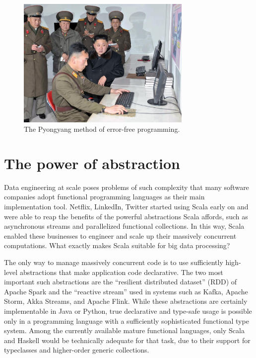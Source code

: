 \begin{figure}
\begin{centering}
\includegraphics[width=0.75\textwidth]{no-bugs}
\par\end{centering}
\caption{The Pyongyang method of error-free programming.}
\label{code-without-bugs}
\end{figure}


\section{The power of abstraction}

Data engineering at scale poses problems of such complexity that many
software companies adopt functional programming languages as their
main implementation tool. Netflix, LinkedIn, Twitter started using
Scala early on and were able to reap the benefits of the powerful
abstractions Scala affords, such as asynchronous streams and parallelized
functional collections. In this way, Scala enabled these businesses
to engineer and scale up their massively concurrent computations.
What exactly makes Scala suitable for big data processing?

The only way to manage massively concurrent code is to use sufficiently
high-level abstractions that make application code declarative. The
two most important such abstractions are the ``resilient distributed
dataset'' (RDD) of Apache Spark and the ``reactive stream'' used
in systems such as Kafka, Apache Storm, Akka Streams, and Apache Flink.
While these abstractions are certainly implementable in Java or Python,
true declarative and type-safe usage is possible only in a programming
language with a sufficiently sophisticated functional type system.
Among the currently available mature functional languages, only Scala
and Haskell would be technically adequate for that task, due to their
support for typeclasses and higher-order generic collections.

